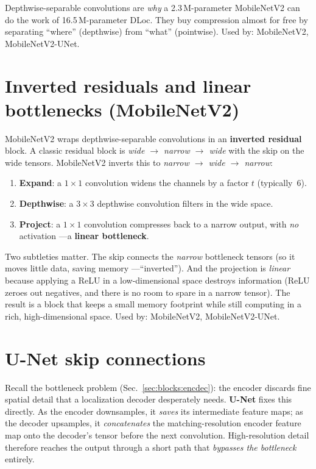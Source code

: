 \begin{keyidea}
Depthwise-separable convolutions are \emph{why} a 2.3\,M-parameter MobileNetV2 can do the work of
16.5\,M-parameter DLoc. They buy compression almost for free by separating ``where'' (depthwise) from
``what'' (pointwise). Used by: MobileNetV2, MobileNetV2-UNet.
\end{keyidea}

\section{Inverted residuals and linear bottlenecks (MobileNetV2)}
\label{sec:blocks:invres}

MobileNetV2 wraps depthwise-separable convolutions in an \textbf{inverted residual} block. A classic
residual block is \emph{wide $\to$ narrow $\to$ wide} with the skip on the wide tensors. MobileNetV2
inverts this to \emph{narrow $\to$ wide $\to$ narrow}:
\begin{enumerate}[leftmargin=1.6em,nosep]
  \item \textbf{Expand}: a $1\times1$ convolution widens the channels by a factor $t$ (typically~6).
  \item \textbf{Depthwise}: a $3\times3$ depthwise convolution filters in the wide space.
  \item \textbf{Project}: a $1\times1$ convolution compresses back to a narrow output, with
  \emph{no} activation ---a \textbf{linear bottleneck}.
\end{enumerate}
Two subtleties matter. The skip connects the \emph{narrow} bottleneck tensors (so it moves little
data, saving memory ---``inverted''). And the projection is \emph{linear} because applying a ReLU in
a low-dimensional space destroys information (ReLU zeroes out negatives, and there is no room to spare
in a narrow tensor). The result is a block that keeps a small memory footprint while still computing
in a rich, high-dimensional space. Used by: MobileNetV2, MobileNetV2-UNet.

\section{U-Net skip connections}
\label{sec:blocks:unet}

Recall the bottleneck problem (Sec.~\ref{sec:blocks:encdec}): the encoder discards fine spatial detail
that a localization decoder desperately needs. \textbf{U-Net} fixes this directly. As the encoder
downsamples, it \emph{saves} its intermediate feature maps; as the decoder upsamples, it
\emph{concatenates} the matching-resolution encoder feature map onto the decoder's tensor before the
next convolution. High-resolution detail therefore reaches the output through a short path that
\emph{bypasses the bottleneck} entirely.


